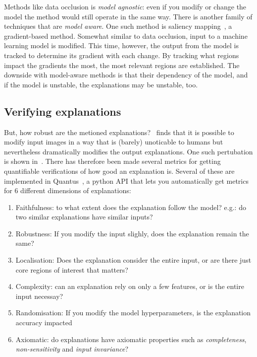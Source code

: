 \documentclass[10pt,twocolumn,letterpaper]{article}
\begin{document}
Methods like data occlusion is \textit{model agnostic}: even if you modify or change the model the method would still operate in the same way. There is another family of techniques that are \textit{model aware}. One such method is saliency mapping~\cite{simonyan2014deep}, a gradient-based method. Somewhat similar to data occlusion, input to a machine learning model is modified. This time, however, the output from the model is tracked to determine its gradient with each change. By tracking what regions impact the gradients the most, the most relevant regions are established. The downside with model-aware methods is that their dependency of the model, and if the model is unstable, the explanations may be unstable, too.

\subsection{Verifying explanations}
But, how robust are the metioned explanations?~\cite{geometryToBlame} finds that it is possible to modify input images in a way that is (barely) unoticable to humans but nevertheless dramatically modifies the output explanations. One such pertubation is shown in~. There has therefore been made several metrics for getting quantifiable verifications of how good an explanation is. Several of these are implemented in Quantus~\cite{hedstrom2023quantus}, a python API that lets you automatically get metrics for 6 different dimensions of explanations:
\begin{enumerate}
  \item Faithfulness: to what extent does the explanation follow the model? e.g.: do two similar explanations have similar inputs?
  \item Robustness: If you modify the input slighly, does the explanation remain the same?
  \item Localisation: Does the explanation consider the entire input, or are there just core regions of interest that matters?
  \item Complexity: can an explanation rely on only a few features, or is the entire input necessay?
  \item Randomisation: If you modify the model hyperparameters, is the explanation accuracy impacted
  \item Axiomatic: do explanations have axiomatic properties such as \textit{completeness}, \textit{non-sensitivity} and \textit{input invariance}?
\end{enumerate}
\end{document}
